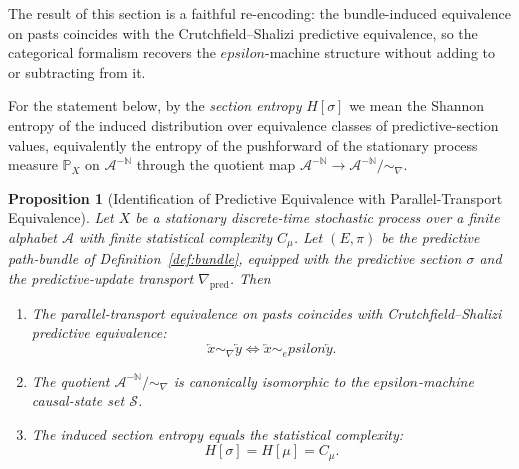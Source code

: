 \documentclass[11pt,a4paper]{article}
\def\varepsilon{epsilon}%
\theoremstyle{plain}
\newtheorem{proposition}[theorem]{Proposition}
\theoremstyle{definition}
\theoremstyle{remark}
\newcommand{\Prob}{\mathbb{P}}
\newcommand{\Alphabet}{\mathcal{A}}
\newcommand{\States}{\mathcal{S}}
\newcommand{\Pred}{\nabla_{\mathrm{pred}}}
\newcommand{\Past}{\overleftarrow{x}}
\newcommand{\Pasts}{\Alphabet^{-\mathbb{N}}}
\begin{document}
The result of this section is a faithful re-encoding: the bundle-induced equivalence on pasts coincides with the Crutchfield--Shalizi predictive equivalence, so the categorical formalism recovers the $\varepsilon$-machine structure without adding to or subtracting from it.

For the statement below, by the \emph{section entropy} $H[\sigma]$ we mean the Shannon entropy of the induced distribution over equivalence classes of predictive-section values, equivalently the entropy of the pushforward of the stationary process measure $\Prob_X$ on $\Pasts$ through the quotient map $\Pasts \to \Pasts / {\sim_\nabla}$.

\begin{proposition}[Identification of Predictive Equivalence with Parallel-Transport Equivalence]
\label{prop:identification}
Let $X$ be a stationary discrete-time stochastic process over a finite alphabet $\Alphabet$ with finite statistical complexity $C_\mu$. Let $(E, \pi)$ be the predictive path-bundle of Definition~\ref{def:bundle}, equipped with the predictive section $\sigma$ and the predictive-update transport $\Pred$. Then
\begin{enumerate}[label=(\alph*)]
    \item The parallel-transport equivalence on pasts coincides with Crutchfield--Shalizi predictive equivalence:
    \begin{equation}
        \Past \sim_\nabla \overleftarrow{y} \iff \Past \sim_\varepsilon \overleftarrow{y}.
    \end{equation}
    \item The quotient $\Pasts / {\sim_\nabla}$ is canonically isomorphic to the $\varepsilon$-machine causal-state set $\States$.
    \item The induced section entropy equals the statistical complexity:
    \begin{equation}
        H[\sigma] = H[\mu] = C_\mu.
    \end{equation}
\end{enumerate}
\end{proposition}
\end{document}
